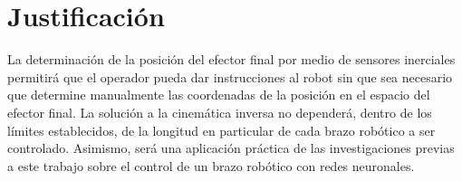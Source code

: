 \section{Justificación}

La determinación de la posición del efector final por medio de sensores inerciales permitirá que el operador pueda dar instrucciones al robot sin que sea necesario que determine manualmente las coordenadas de la posición en el espacio del efector final. La solución a la cinemática inversa no dependerá, dentro de los límites establecidos, de la longitud en particular de cada brazo robótico a ser controlado. Asimismo, será una aplicación práctica de las investigaciones previas a este trabajo sobre el control de un brazo robótico con redes neuronales.